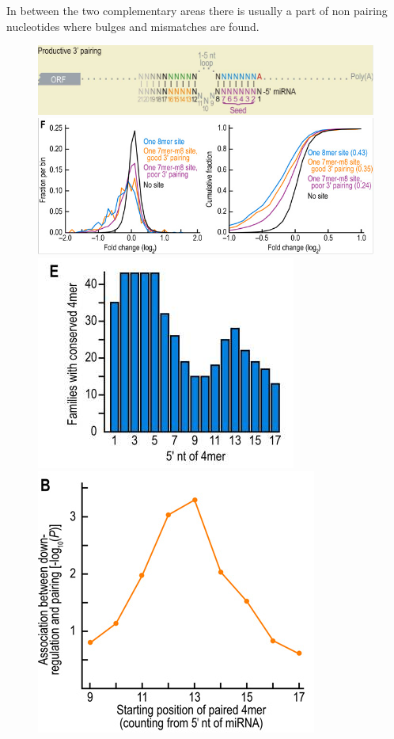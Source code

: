 \documentclass[12pt]{article}
\begin{document}
In between the two complementary areas there is usually a part of non pairing nucleotides where bulges and mismatches are found.

\begin{figure}
\includegraphics[scale=0.3]{results/additional_pairing.PNG}
\label{addipairing}
\includegraphics[scale=0.5]{results/site_efficacy.PNG} 
\label{efficacy}
\includegraphics[scale=0.5]{results/sites_conserved.PNG} 
\label{conserved}
\includegraphics[scale=0.5]{results/sites_regulation.PNG} 
\label{siteregulation}
\end{figure}
\end{document}
